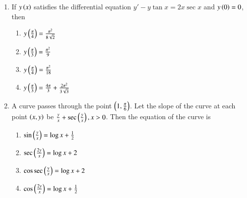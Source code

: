 \documentclass[journal,12pt,twocolumn]{IEEEtran}
\theoremstyle{remark}
\begin{document}
\begin{enumerate}
\item  If $y\left(x\right)$ satisfies the differential equation $y' - y \tan x = 2x \sec x $ and $y\left(0\right) = 0 $, then \hfill {}

\begin{multicols}{2}
\begin{enumerate}
    \item $ y\left(\frac{\pi}{4}\right) = \frac{\pi^2}{8\sqrt{2}} $
    \item $ y\left(\frac{\pi}{3}\right) = \frac{\pi^2}{9} $
    \item $ y\left(\frac{\pi}{4}\right) = \frac{\pi^2}{18} $
    \item $ y\left(\frac{\pi}{3}\right) = \frac{4\pi}{3} + \frac{2\pi^2}{3\sqrt{3}} $
\end{enumerate}
\end{multicols}

\item A curve passes through the point $ \left(1,\frac{\pi}{6}\right) $. Let the slope of the curve at each point $ \left(x, y\right) $ be $ \frac{y}{x} + \sec\left(\frac{y}{x}\right), x > 0 $. Then the equation of the curve is \hfill {}

\begin{multicols}{2}
\begin{enumerate}
    \item $ \sin\left(\frac{y}{x}\right) = \log x + \frac{1}{2} $
    \item $\sec\left(\frac{2y}{x}\right) = \log x + 2$
    \item $\cos\sec\left(\frac{y}{x}\right) = \log x + 2 $
    \item $ \cos\left(\frac{2y}{x}\right) = \log x + \frac{1}{2} $
\end{enumerate}
\end{multicols}
\end{enumerate}
\end{document}
